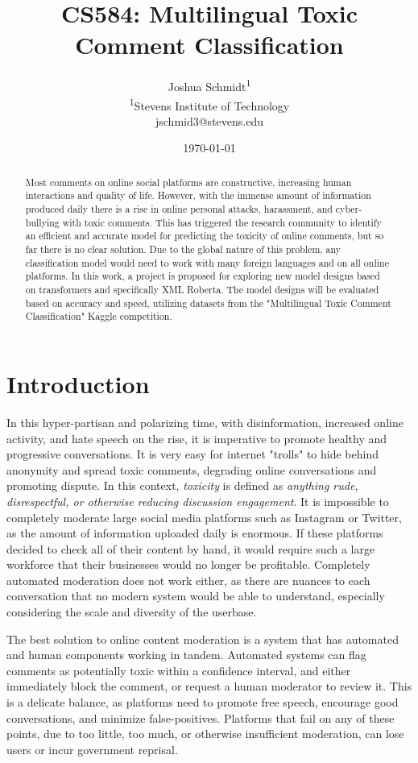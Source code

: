 \documentclass{article}
\title{CS584: Multilingual Toxic Comment Classification} %
\author{
Joshua Schmidt\textsuperscript{1}\\
\textsuperscript{1}{Stevens Institute of Technology}\\
jschmid3@stevens.edu
}
\date{\today}
\begin{document}
\maketitle
\begin{abstract}

Most comments on online social platforms are constructive, increasing human interactions and quality of life. However, with the immense amount of information produced daily there is a rise in online personal attacks, harassment, and cyber-bullying with toxic comments. This has triggered the research community to identify an efficient and accurate model for predicting the toxicity of online comments, but so far there is no clear solution. Due to the global nature of this problem, any classification model would need to work with many foreign languages and on all online platforms. In this work, a project is proposed for exploring new model designs based on transformers and specifically XML Roberta. The model designs will be evaluated based on accuracy and speed, utilizing datasets from the "Multilingual Toxic Comment Classification" Kaggle competition.

\end{abstract}

\section{Introduction}

In this hyper-partisan and polarizing time, with disinformation, increased online activity, and hate speech on the rise, it is imperative to promote healthy and progressive conversations. It is very easy for internet "trolls" to hide behind anonymity and spread toxic comments, degrading online conversations and promoting dispute. In this context, \textit{toxicity} is defined as \textit{anything rude, disrespectful, or otherwise reducing discussion engagement}. It is impossible to completely moderate large social media platforms such as Instagram or Twitter, as the amount of information uploaded daily is enormous. If these platforms decided to check all of their content by hand, it would require such a large workforce that their businesses would no longer be profitable. Completely automated moderation does not work either, as there are nuances to each conversation that no modern system would be able to understand, especially considering the scale and diversity of the userbase.

The best solution to online content moderation is a system that has automated and human components working in tandem. Automated systems can flag comments as potentially toxic within a confidence interval, and either immediately block the comment, or request a human moderator to review it. This is a delicate balance, as platforms need to promote free speech, encourage good conversations, and minimize false-positives. Platforms that fail on any of these points, due to too little, too much, or otherwise insufficient moderation, can lose users or incur government reprisal.
\end{document}
